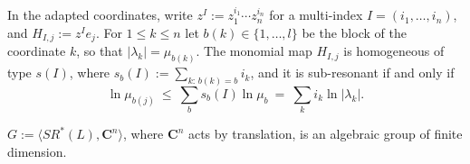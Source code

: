 \documentclass[10pt,a4paper]{amsart}
\newcommand{\C}{\mathbf{C}}
\begin{document}
\begin{remark}\label{r:monomial}
In the adapted coordinates, write $z^I:=z_1^{i_1}\cdots z_n^{i_n}$ for a multi-index $I=(i_1,\dots,i_n)$, and $H_{I,j}:=z^Ie_j$. For $1\le k\le n$ let $b(k)\in\{1,\dots,l\}$ be the block of the coordinate $k$, so that $|\lambda_k|=\mu_{b(k)}$. The monomial map $H_{I,j}$ is homogeneous of type $s(I)$, where $s_b(I):=\sum_{k:\,b(k)=b} i_k$, and it is sub-resonant if and only if
\[
\ln\mu_{b(j)}\ \le\ \sum_{b}s_b(I)\ln\mu_b\ =\ \sum_{k} i_k\ln|\lambda_k| .
\]
\end{remark}

\begin{proposition}\label{p:Ggroup}
$G := \langle SR^*(L), \C^n \rangle$, where $\C^n$ acts by translation, is an algebraic group of finite dimension.
\end{proposition}
\end{document}
